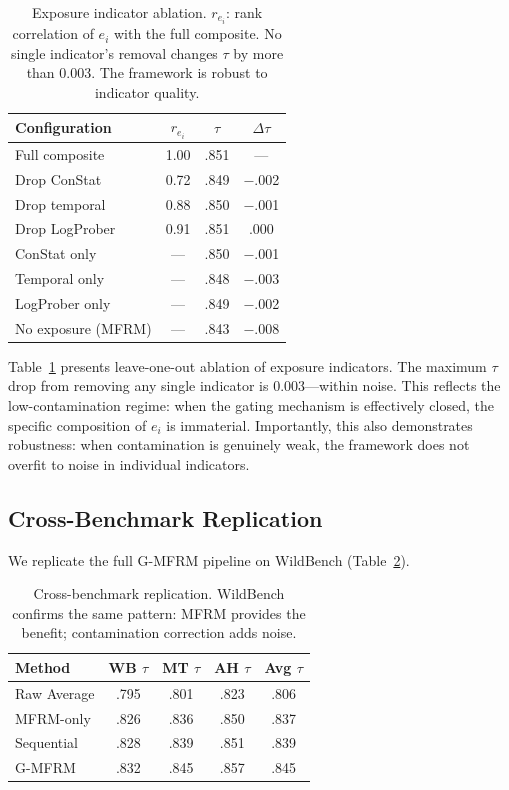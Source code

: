 \documentclass[11pt]{article}
\begin{document}
\begin{table}[t]
\centering
\small
\begin{tabular}{lccc}
\toprule
Configuration & $r_{e_i}$ & $\tau$ & $\Delta\tau$ \\
\midrule
Full composite & 1.00 & .851 & --- \\
Drop ConStat & 0.72 & .849 & $-$.002 \\
Drop temporal & 0.88 & .850 & $-$.001 \\
Drop LogProber & 0.91 & .851 & .000 \\
ConStat only & --- & .850 & $-$.001 \\
Temporal only & --- & .848 & $-$.003 \\
LogProber only & --- & .849 & $-$.002 \\
No exposure (MFRM) & --- & .843 & $-$.008 \\
\bottomrule
\end{tabular}
\caption{Exposure indicator ablation. $r_{e_i}$: rank correlation of $e_i$ with the full composite. No single indicator's removal changes $\tau$ by more than 0.003. The framework is robust to indicator quality.}
\label{tab:ablation}
\end{table}

Table~\ref{tab:ablation} presents leave-one-out ablation of exposure indicators. The maximum $\tau$ drop from removing any single indicator is 0.003---within noise. This reflects the low-contamination regime: when the gating mechanism is effectively closed, the specific composition of $e_i$ is immaterial. Importantly, this also demonstrates robustness: when contamination is genuinely weak, the framework does not overfit to noise in individual indicators.

\subsection{Cross-Benchmark Replication}
\label{sec:wildbench}

We replicate the full G-MFRM pipeline on WildBench (Table~\ref{tab:wildbench}).

\begin{table}[t]
\centering
\small
\begin{tabular}{lcccc}
\toprule
Method & WB $\tau$ & MT $\tau$ & AH $\tau$ & Avg $\tau$ \\
\midrule
Raw Average & .795 & .801 & .823 & .806 \\
MFRM-only & .826 & .836 & .850 & .837 \\
Sequential & .828 & .839 & .851 & .839 \\
G-MFRM & .832 & .845 & .857 & .845 \\
\bottomrule
\end{tabular}
\caption{Cross-benchmark replication. WildBench confirms the same pattern: MFRM provides the benefit; contamination correction adds noise.}
\label{tab:wildbench}
\end{table}
\end{document}

